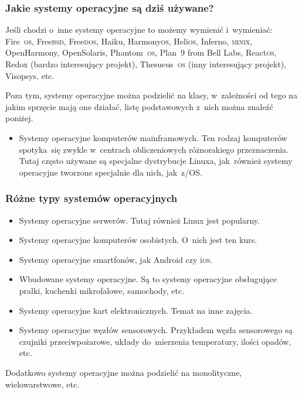 \documentclass[10pt,t]{beamer}
\begin{document}
\begin{frame}
  \frametitle{Jakie systemy operacyjne są dziś używane?}


  Jeśli chodzi o~inne systemy operacyjne to możemy wymienić i~wymieniać:
  Fire~\textsc{os}, Free\textsc{bsd}, Free\textsc{dos}, Haiku,
  Harmony\textsc{os}, Heli\textsc{os}, Inferno, \textsc{minix},
  OpenHarmony, OpenSolaris, Phantom~\textsc{os}, Plan~9
  from Bell Labs, React\textsc{os}, Redox (bardzo interesujący projekt),
  Thesueus~\textsc{os} (inny interesujący projekt), Visopsys, etc.

  Poza tym, systemy operacyjne można podzielić na klasy, w~zależności od
  tego na jakim sprzęcie mają one działać, listę podstawowych z~nich można
  znaleźć poniżej.

  \begin{itemize}

  \item Systemy operacyjne komputerów mainframowych. Ten rodzaj komputerów
    spotyka~się zwykle w~centrach obliczeniowych różnorakiego
    przeznaczenia. Tutaj często używane są specjalne dystrybucje Linuxa,
    jak~również systemy operacyjne tworzone specjalnie dla nich, jak~z/OS.

  \end{itemize}

\end{frame}





\begin{frame}
  \frametitle{Różne typy systemów operacyjnych}


  \begin{itemize}

  \item Systemy operacyjne serwerów. Tutaj również Linux jest popularny.

  \item Systemy operacyjne komputerów osobistych. O~nich jest ten kurs.

  \item Systemy operacyjne smartfonów, jak Android czy i\textsc{os}.

  \item Wbudowane systemy operacyjne. Są to systemy operacyjne obsługujące
    pralki, kuchenki mikrofalowe, samochody, etc.

  \item Systemy operacyjne kart elektronicznych. Temat na inne zajęcia.

  \item Systemy operacyjne węzłów sensorowych. Przykładem węzła sensorowego
    są czujniki przeciwpożarowe, układy do~mierzenia temperatury, ilości
    opadów, etc.

  \end{itemize}

  Dodatkowo systemy operacyjne można podzielić na monolityczne,
  wielowarstwowe, etc.

\end{frame}
\end{document}
